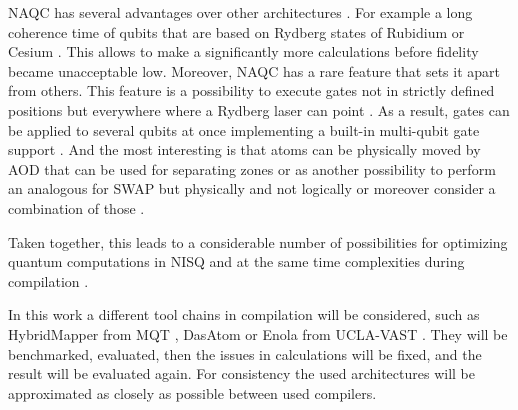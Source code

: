 \ac{NAQC} has several advantages over other architectures \parencite{schmid2023hybridcircuitmappingleveraging}.
For example a long coherence time of qubits that are based on Rydberg states of Rubidium or Cesium \parencite{Schmid_2024_NeutralAtomBasics}.
This allows to make a significantly more calculations before fidelity became unacceptable low. 
Moreover, \ac{NAQC} has a rare feature that sets it apart from others.
This feature is a possibility to execute gates not in strictly defined positions but everywhere where a Rydberg laser can point \parencite{Henriet_2020,Schmid_2024_NeutralAtomBasics}.
As a result, gates can be applied to several qubits at once implementing a built-in multi-qubit gate support \parencite{Wintersperger_2023,Henriet_2020,Schmid_2024_NeutralAtomBasics, Levine_2019}.
And the most interesting is that atoms can be physically moved by \ac{AOD} 
that can be used for separating zones or as another possibility 
to perform an analogous for SWAP but physically and not logically or moreover consider a combination of those \parencite{Wintersperger_2023, schmid2023hybridcircuitmappingleveraging}.

Taken together, this leads to a considerable number of possibilities for optimizing quantum computations in \ac{NISQ}
and at the same time complexities during compilation \parencite{huang2024qubitmappingadaptivedivideandconquer, huang2025dasatomdivideandshuttleatomapproach, Tan_2025_Enola, Schmid_2024_NeutralAtomBasics, schmid2023hybridcircuitmappingleveraging, 10082942}.

In this work a different tool chains in compilation will be considered, such as HybridMapper from \ac{MQT} \parencite{schmid2023hybridcircuitmappingleveraging}, 
DasAtom \parencite{huang2025dasatomdivideandshuttleatomapproach} or Enola from \ac{UCLA-VAST} \parencite{Tan_2025_Enola}.
They will be benchmarked, evaluated, then the issues in calculations \parencite{gao2025optimalcompilationstrategiesqft} will be fixed, and the result will be evaluated again.
For consistency the used architectures will be approximated as closely as possible between used compilers.